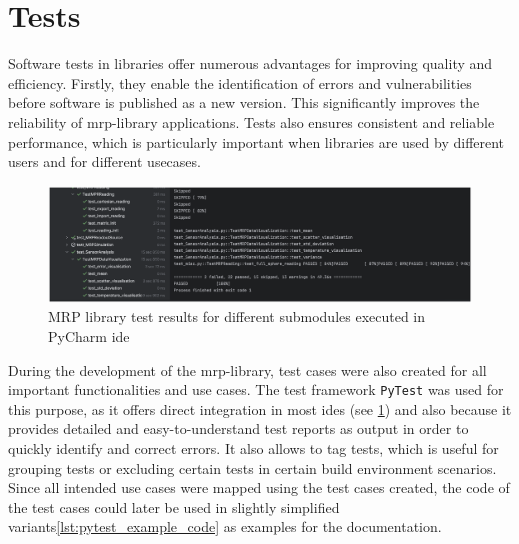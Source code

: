 \hypertarget{tests}{%
\section{Tests}\label{tests}}

Software tests in libraries offer numerous advantages for improving
quality and efficiency. Firstly, they enable the identification of
errors and vulnerabilities before software is published as a new
version. This significantly improves the reliability of
\gls{mrp}-library applications. Tests also ensures consistent and
reliable performance, which is particularly important when libraries are
used by different users and for different usecases.

\begin{figure}
\centering
\includegraphics{./generated_images/border_MRP_library_test_results_for_different_submodules_executed_in_PyCharm_(+ide).png}
\caption{MRP library test results for different submodules executed in
PyCharm \gls{ide}
\label{MRP_library_test_results_for_different_submodules_executed_in_PyCharm_(+ide).png}}
\end{figure}

During the development of the \gls{mrp}-library, test cases were also
created for all important functionalities and use cases. The test
framework \passthrough{\lstinline!PyTest!}\cite{PyTest} was used for
this purpose, as it offers direct integration in most \gls{ide}s (see
\ref{MRP_library_test_results_for_different_submodules_executed_in_PyCharm_(+ide).png})
and also because it provides detailed and easy-to-understand test
reports as output in order to quickly identify and correct errors. It
also allows to tag tests, which is useful for grouping tests or
excluding certain tests in certain build environment scenarios. Since
all intended use cases were mapped using the test cases created, the
code of the test cases could later be used in slightly simplified
variants\ref{lst:pytest_example_code} as examples for the documentation.

